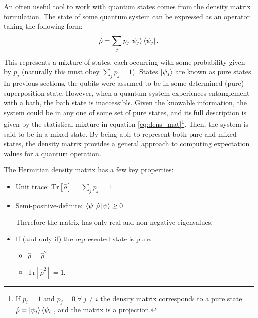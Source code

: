 An often useful tool to work with quantum states comes from the density matrix formulation. The state of some quantum system can be expressed as an operator taking the following form:
\begin{equation}
    \Hat{\rho} = \sum_j p_j \ket{\psi_j}\bra{\psi_j}.
    \label{eq:dens_mat}
\end{equation}
This represents a mixture of states, each occurring with some probability given by $p_j$ (naturally this must obey $\sum_j p_j = 1$). States $\ket{\psi_j}$ are known as pure states. In previous sections, the qubits were assumed to be in some determined (pure) superposition state. However, when a quantum system experiences entanglement with a bath, the bath state is inaccessible. Given the knowable information, the system could be in any one of some set of pure states, and its full description is given by the statistical mixture in equation \ref{eq:dens_mat}\footnote{If $p_i=1$ and $p_j=0 \;\forall\ j \neq i$ the density matrix corresponds to a pure state $\Hat{\rho} = \ket{\psi_i}\bra{\psi_i}$, and the matrix is a projection.}. Then, the system is said to be in a mixed state. By being able to represent both pure and mixed states, the density matrix provides a general approach to computing expectation values for a quantum operation. 

The Hermitian density matrix has a few key properties: 
\begin{itemize}
    \item Unit trace: $\mathrm{Tr}\left[\hat{\rho}\right] =\sum_j p_j = 1 $
    \item Semi-positive-definite: $\bra{\psi}\hat\rho\ket{\psi}\geq 0$
    
    Therefore the matrix has only real and non-negative eigenvalues.
    \item If (and only if) the represented state is pure:
    \begin{itemize}
        \item $\hat\rho=\hat\rho^2$
        \item $\mathrm{Tr}\left[\hat\rho^2\right] = 1$.
    \end{itemize}
\end{itemize}

